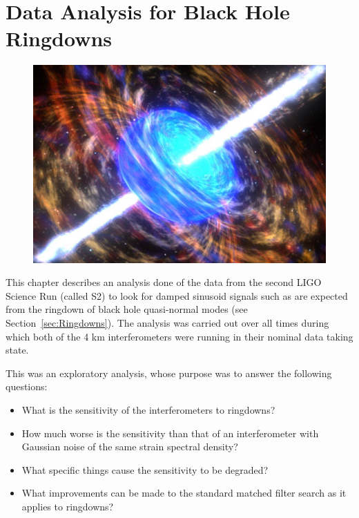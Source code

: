 \chapter{Data Analysis for Black Hole Ringdowns}
\label{chap:ringdowns}


\begin{figure}[!h]
\centerline{\includegraphics[angle=0,width=6.5in]{Figures/Chap1/GRB-DestroyStar.jpg}}
\end{figure}
\clearpage


This chapter describes an analysis done of the data from the second LIGO Science
Run (called S2) to look for damped sinusoid signals such as are expected from
the ringdown of black hole quasi-normal modes (see Section~\ref{sec:Ringdowns}). The
analysis was carried out over all times during which both of the 4 km interferometers were
running in their nominal data taking state.

This was an exploratory analysis, whose purpose was to answer the following questions:

\begin{itemize}

\item What is the sensitivity of the interferometers to ringdowns?

\item How much worse is the sensitivity than that of an interferometer with
      Gaussian noise of the same strain spectral density?

\item What specific things cause the sensitivity to be degraded?

\item What improvements can be made to the standard matched filter search
      as it applies to ringdowns? 

\end{itemize} 

